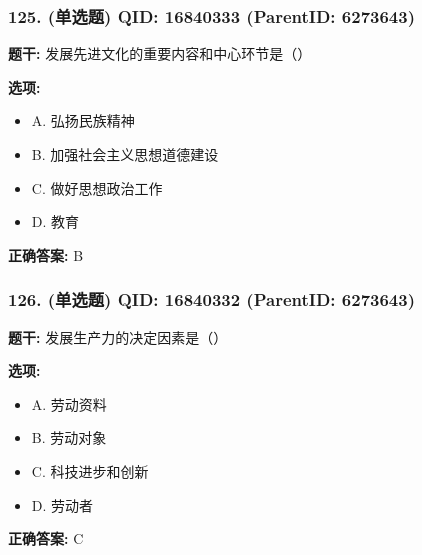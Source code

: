 \documentclass[12pt,UTF8]{ctexart}
\begin{document}
\vspace{0.3em}\hrulefill\vspace{0.7em}

\subsubsection*{125. (单选题) \small QID: 16840333 (ParentID: 6273643)}

\textbf{题干:}
发展先进文化的重要内容和中心环节是（）



\textbf{选项:}
\begin{itemize}[leftmargin=*]

  \item A. 弘扬民族精神

  \item B. 加强社会主义思想道德建设

  \item C. 做好思想政治工作

  \item D. 教育

\end{itemize}

\textbf{正确答案:}
B

\vspace{0.3em}\hrulefill\vspace{0.7em}

\subsubsection*{126. (单选题) \small QID: 16840332 (ParentID: 6273643)}

\textbf{题干:}
发展生产力的决定因素是（）



\textbf{选项:}
\begin{itemize}[leftmargin=*]

  \item A. 劳动资料

  \item B. 劳动对象

  \item C. 科技进步和创新

  \item D. 劳动者

\end{itemize}

\textbf{正确答案:}
C

\vspace{0.3em}\hrulefill\vspace{0.7em}
\end{document}
